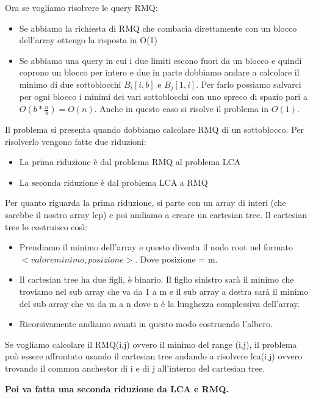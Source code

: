 \documentclass[14pt]{extreport}
\begin{document}
Ora se vogliamo risolvere le query RMQ:
\begin{itemize}
\item Se abbiamo la richiesta di RMQ che combacia direttamente con un blocco dell'array ottengo la risposta in O(1)
\item Se abbiamo una query in cui i due limiti escono fuori da un blocco e quindi coprono un blocco per intero e due in parte dobbiamo andare a calcolare il minimo di due sottoblocchi $B_i[i,b]$ e $B_j[1,i]$. Per farlo possiamo salvarci per ogni blocco i minimi dei vari sottoblocchi con uno spreco di spazio pari a $O(b*\frac{n}{b})=O(n)$.
Anche in questo caso si risolve il problema in $O(1)$.
\end{itemize}

Il problema si presenta quando dobbiamo calcolare RMQ di un sottoblocco. 
Per risolverlo vengono fatte due riduzioni:
\begin{itemize}
\item La prima riduzione è dal problema RMQ al problema LCA
\item La seconda riduzione è dal problema LCA a RMQ
\end{itemize}

Per quanto riguarda la prima riduzione, si parte con un array di interi (che sarebbe il nostro array lcp) e poi andiamo a creare un cartesian tree. Il cartesian tree lo costruisco così:
\begin{itemize}
\item Prendiamo il minimo dell'array e questo diventa il nodo root nel formato $<valore minimo, posizione>$. Dove posizione = m.
\item Il cartesian tree ha due figli, è binario. Il figlio sinistro sarà il minimo che troviamo nel sub array che va da 1 a m e il sub array a destra sarà il minimo del sub array che va da m a n dove n è la lunghezza complessiva dell'array.
\item Ricorsivamente andiamo avanti in questo modo costruendo l'albero.
\end{itemize}

Se vogliamo calcolare il RMQ(i,j) ovvero il minimo del range (i,j), il problema può essere affrontato usando il cartesian tree andando a risolvere lca(i,j) ovvero trovando il common anchestor di i e di j all'interno del cartesian tree.

\textbf{Poi va fatta una seconda riduzione da LCA e RMQ.}
\end{document}
